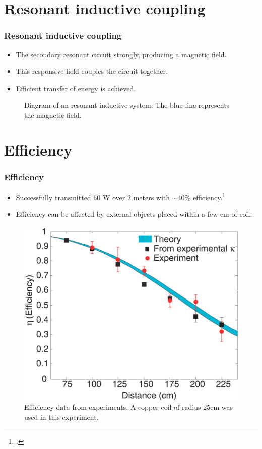 \documentclass{beamer}
\begin{document}
\section{Resonant inductive coupling}
\begin{frame}
  \frametitle{Resonant inductive coupling}
  \begin{itemize}
    \item The secondary resonant circuit strongly, producing a magnetic field.
    \item This responsive field couples the circuit together.
    \item Efficient transfer of energy is achieved.
  \end{itemize}
  \begin{figure}
    
    \caption{Diagram of an resonant inductive system.
    The blue line represents the magnetic field.}
  \end{figure}
\end{frame}

\section{Efficiency}
\begin{frame}
  \frametitle{Efficiency}
  \begin{itemize}
    \item Successfully transmitted $60$ W over $2$ meters with $\sim40\%$ efficiency.\footcite{StrongCouple}
    \item Efficiency can be affected by external objects placed within a few cm of coil.
  \end{itemize}
  \begin{figure}
    \includegraphics[scale=0.1]{images/Experimental.jpg}
    \caption{Efficiency data from experiments.
    A copper coil of radius $25$cm was used in this experiment. \textcite{StrongCouple}}
  \end{figure}
\end{frame}
\end{document}
